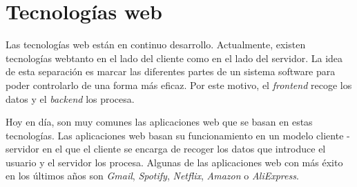 \section{Tecnologías web}
Las tecnologías web están en continuo desarrollo. Actualmente, existen tecnologías webtanto en el lado del cliente como en el lado del servidor. La idea de esta separación es marcar las diferentes partes de un sistema software para poder controlarlo de una forma más eficaz. Por este motivo, el \textit{frontend} recoge los datos y el \textit{backend} los procesa. \newline

Hoy en día, son muy comunes las aplicaciones web que se basan en estas tecnologías. Las aplicaciones web basan su funcionamiento en un modelo cliente - servidor en el que el cliente se encarga de recoger los datos que introduce el usuario y el servidor los procesa. Algunas de las aplicaciones web con más éxito en los últimos años son \textit{Gmail}, \textit{Spotify}, \textit{Netflix}, \textit{Amazon} o \textit{AliExpress}.

